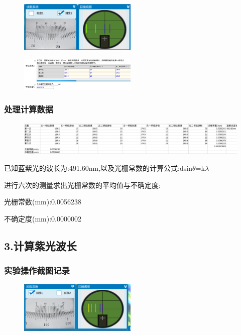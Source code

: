 \documentclass{article}
\begin{document}
            \begin{figure}[H]
                \centering
                \includegraphics[width=0.5\textwidth]{14.png}
                \end{figure}

                \begin{figure}[H]
                    \centering
                    \includegraphics[width=0.5\textwidth]{31.png}
                    \end{figure}
    
\subsubsection*{处理计算数据}
\begin{figure}[H]
    \centering
    \includegraphics[width=1\textwidth]{6.png}
    \end{figure}
已知蓝紫光的波长为:491.60nm,以及光栅常数的计算公式:dsin$\theta$=k$\lambda$ 

进行六次的测量求出光栅常数的平均值与不确定度:

光栅常数(mm):0.0056238

不确定度(mm):0.0000002


\subsection*{3.计算紫光波长}
\subsubsection*{实验操作截图记录}

\begin{figure}[H]
    \centering
    \includegraphics[width=0.5\textwidth]{15.png}
    \end{figure}
\end{document}
